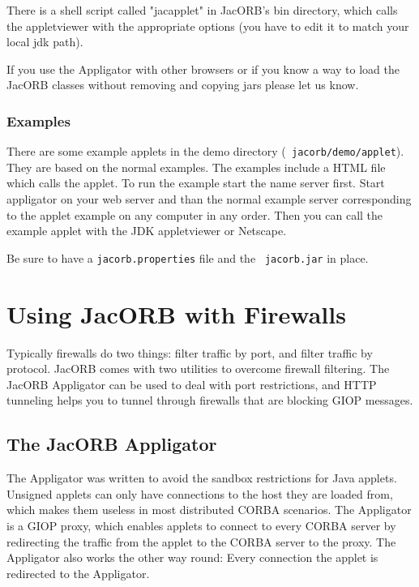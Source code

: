 \documentclass[12pt]{scrbook}
\begin{document}

There is a shell script  called "jacapplet" in JacORB's bin directory,
which calls the appletviewer with the appropriate options (you have to
edit it to match your local jdk path).

If you use the Appligator with other browsers or if you know a 
way to load the JacORB classes without removing and copying jars please 
let us know.

\subsubsection*{Examples}

There  are   some  example  applets   in  the  demo   directory  ({\tt
jacorb/demo/applet}).   They are  based on  the normal  examples.  The
examples  include a  HTML file  which calls  the applet.   To  run the
example  start the  name server  first. Start  appligator on  your web
server and than the normal  example server corresponding to the applet
example on any  computer in any order.  Then you  can call the example
applet with the JDK appletviewer or Netscape.

Be  sure  to  have  a   {\tt  jacorb.properties}  file  and  the  {\tt
jacorb.jar} in place.


\section{Using JacORB with Firewalls}

Typically firewalls do two things:  filter traffic by port, and filter
traffic  by protocol.   JacORB comes  with two  utilities  to overcome
firewall filtering.   The JacORB Appligator  can be used to  deal with
port  restrictions, and  HTTP tunneling  helps you  to  tunnel through
firewalls that are blocking GIOP messages.


\subsection{The JacORB Appligator}

The Appligator was written to  avoid the sandbox restrictions for Java
applets. Unsigned applets  can only have connections to  the host they
are loaded  from, which makes  them useless in most  distributed CORBA
scenarios. The  Appligator is a  GIOP proxy, which enables  applets to
connect  to every  CORBA server  by redirecting  the traffic  from the
applet to the CORBA server to the proxy. The Appligator also works the
other  way round:  Every connection  the applet  is redirected  to the
Appligator.
\end{document}
